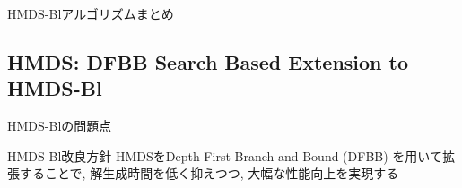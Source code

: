 \begin{frame}{HMDS-Blアルゴリズムまとめ}
\end{frame}


\subsection{HMDS: DFBB Search Based Extension to HMDS-Bl}
\label{ssec: hmds: dfbb search based extension to hmds-bl}

\begin{frame}{HMDS-Blの問題点}
\end{frame}

\begin{frame}{HMDS-Bl改良方針}
    HMDSをDepth-First Branch and Bound (DFBB) を用いて拡張することで, 解生成時間を低く抑えつつ, 大幅な性能向上を実現する
\end{frame}

